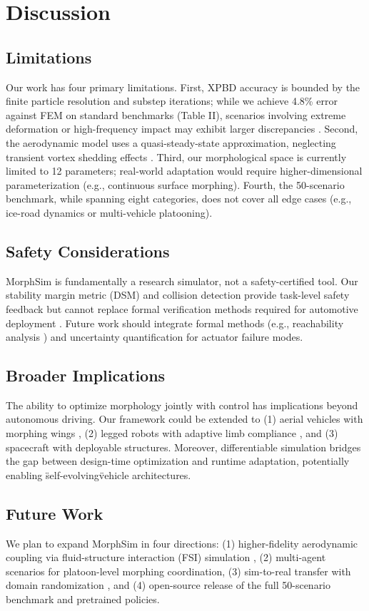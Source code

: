 \section{Discussion}

\subsection{Limitations}
Our work has four primary limitations. First, XPBD accuracy is bounded by the finite particle resolution and substep iterations; while we achieve 4.8\% error against FEM on standard benchmarks (Table II), scenarios involving extreme deformation or high-frequency impact may exhibit larger discrepancies \cite{diffxpbd_2023}. Second, the aerodynamic model uses a quasi-steady-state approximation, neglecting transient vortex shedding effects \cite{activeaero_2024}. Third, our morphological space is currently limited to 12 parameters; real-world adaptation would require higher-dimensional parameterization (e.g., continuous surface morphing). Fourth, the 50-scenario benchmark, while spanning eight categories, does not cover all edge cases (e.g., ice-road dynamics or multi-vehicle platooning).

\subsection{Safety Considerations}
MorphSim is fundamentally a research simulator, not a safety-certified tool. Our stability margin metric (DSM) and collision detection provide task-level safety feedback but cannot replace formal verification methods required for automotive deployment \cite{chen2021safe}. Future work should integrate formal methods (e.g., reachability analysis \cite{endtoend_survey_2025}) and uncertainty quantification for actuator failure modes.

\subsection{Broader Implications}
The ability to optimize morphology jointly with control has implications beyond autonomous driving. Our framework could be extended to (1) aerial vehicles with morphing wings \cite{morphingwing_2024}, (2) legged robots with adaptive limb compliance \cite{pivotal_2024}, and (3) spacecraft with deployable structures. Moreover, differentiable simulation bridges the gap between design-time optimization and runtime adaptation, potentially enabling \"self-evolving\" vehicle architectures.

\subsection{Future Work}
We plan to expand MorphSim in four directions: (1) higher-fidelity aerodynamic coupling via fluid-structure interaction (FSI) simulation \cite{warp_2024}, (2) multi-agent scenarios for platoon-level morphing coordination, (3) sim-to-real transfer with domain randomization \cite{isaacgym_2024}, and (4) open-source release of the full 50-scenario benchmark and pretrained policies.